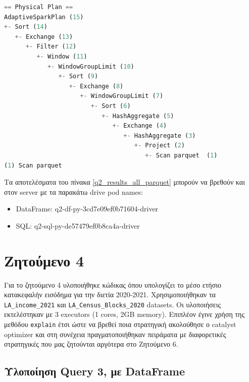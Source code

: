 \documentclass[12pt, a4paper]{article}
\begin{document}
\begin{lstlisting}[language=python, 
                    breaklines=true, 
                    showstringspaces=false,
                    frame=single, 
                    lineskip=-1pt, 
                    basicstyle=\ttfamily\small, 
                    caption={Physical Plan για το SQL, (Q2\_SQL.py)}, 
                    captionpos=b, 
                    label={phy_plan_q2_sql}]
== Physical Plan ==
AdaptiveSparkPlan (15)
+- Sort (14)
   +- Exchange (13)
      +- Filter (12)
         +- Window (11)
            +- WindowGroupLimit (10)
               +- Sort (9)
                  +- Exchange (8)
                     +- WindowGroupLimit (7)
                        +- Sort (6)
                           +- HashAggregate (5)
                              +- Exchange (4)
                                 +- HashAggregate (3)
                                    +- Project (2)
                                       +- Scan parquet  (1)
(1) Scan parquet 
\end{lstlisting}

\noindent Τα αποτελέσματα του πίνακα \ref{q2_results_all_parquet} μπορούν να βρεθούν και στον server
με τα παρακάτω drive pod names: 

\begin{itemize}
\item DataFrame: q2-df-py-3cd7e09ef0b71604-driver
\item SQL: q2-sql-py-de57479ef0b8ca4a-driver
\end{itemize}


\section*{Ζητούμενο 4}

Για το ζητούμενο 4 υλοποιήθηκε κώδικας όπου υπολογίζει το μέσο ετήσιο κατακεφαλήν
εισόδημα για την διετία 2020-2021. Χρησιμοποιήθηκαν τα \texttt{LA\_income\_2021}
και \texttt{LA\_Census\_Blocks\_2020} datasets. Οι υλοποιήσεις εκτελέστηκαν με
3 executors (1 cores, 2GB memory). Επιπλέον έγινε χρήση της μεθόδου
\texttt{explain} έτσι ώστε να βρεθεί ποια στρατηγική ακολούθησε ο catalyst optimizer
και στη συνέχεια πραγματοποιήθηκαν πειράματα με διαφορετικές στρατηγικές που μας ζητούνται
αργότερα στο Ζητούμενο 6.

\subsection*{Υλοποίηση Query 3, με DataFrame}
\end{document}
